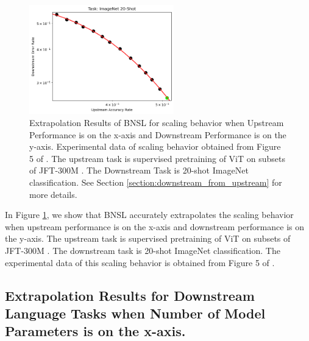 \documentclass{article} %
\begin{document}
\begin{figure}[htbp]
    \centering
\includegraphics[width=0.56\textwidth]{figures/downstream_from_upstream/Task_ImageNet_20-shot.png}

    \caption{
    Extrapolation Results of BNSL for scaling behavior when Upstream Performance is on the x-axis and Downstream Performance is on the y-axis. Experimental data of scaling behavior obtained from Figure 5 of \cite{abnar2021exploring}. The upstream task is supervised pretraining of ViT \citep{dosovitskiy2020image} on subsets of JFT-300M \citep{sun2017revisiting}. The Downstream Task is 20-shot ImageNet classification. See Section \ref{section:downstream_from_upstream} for more details.
    }
    \label{fig:downstream_from_upstream}
\end{figure}

In Figure \ref{fig:downstream_from_upstream}, we show that BNSL accurately extrapolates the scaling behavior when upstream performance is on the x-axis and downstream performance is on the y-axis. The upstream task is supervised pretraining of ViT \citep{dosovitskiy2020image} on subsets of JFT-300M \citep{sun2017revisiting}. The downstream task is 20-shot ImageNet classification. The experimental data of this scaling behavior is obtained from Figure 5 of \cite{abnar2021exploring}.

\FloatBarrier

\iffalse

\subsection{Extrapolation Results for Downstream Language Tasks when Number of Model Parameters is on the x-axis.}
\label{section:language_tasks__number_of_parameters}
\end{document}
